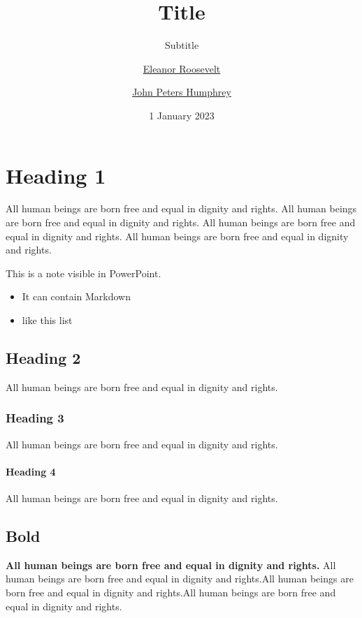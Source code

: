 \documentclass[
]{beamer}
\title{Title}
\subtitle{Subtitle}
\author{\href{eleanor.eoosevelt@domain.com}{Eleanor
Roosevelt} \and \href{jph@domain.com}{John Peters Humphrey}}
\date{1 January 2023}
\providecommand{\tightlist}{%
  \setlength{\itemsep}{0pt}\setlength{\parskip}{0pt}}
\begin{document}
\maketitle

{
\setcounter{tocdepth}{3}
\tableofcontents
}
\section{Heading 1}\label{heading-1}

All human beings are born free and equal in dignity and rights. All
human beings are born free and equal in dignity and rights. All human
beings are born free and equal in dignity and rights. All human beings
are born free and equal in dignity and rights.

This is a note visible in PowerPoint.

\begin{itemize}
\tightlist
\item
  It can contain Markdown
\item
  like this list
\end{itemize}

\subsection{Heading 2}\label{heading-2}

All human beings are born free and equal in dignity and rights.

\subsubsection{Heading 3}\label{heading-3}

All human beings are born free and equal in dignity and rights.

\paragraph{Heading 4}\label{heading-4}

All human beings are born free and equal in dignity and rights.

\subsection{Bold}\label{bold}

\textbf{All human beings are born free and equal in dignity and rights.}
All human beings are born free and equal in dignity and rights.All human
beings are born free and equal in dignity and rights.All human beings
are born free and equal in dignity and rights.
\end{document}

